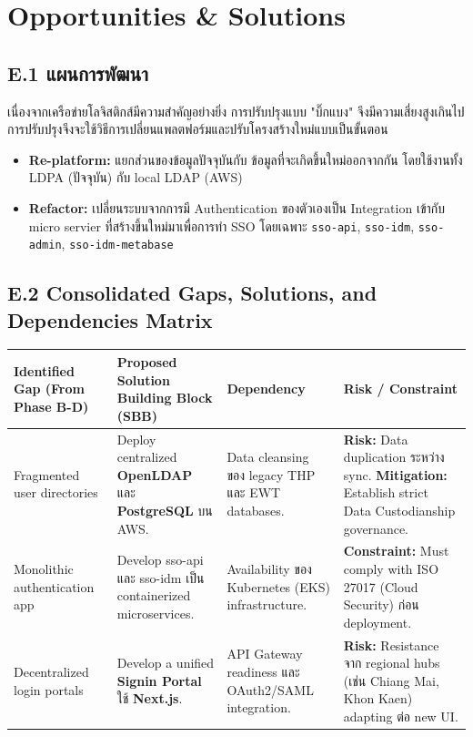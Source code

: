 \newpage\sloppy
\section{Opportunities \& Solutions}

\subsection{E.1 แผนการพัฒนา}
เนื่องจากเครือข่ายโลจิสติกส์มีความสำคัญอย่างยิ่ง การปรับปรุงแบบ "บิ๊กแบง" จึงมีความเสี่ยงสูงเกินไป การปรับปรุงจึงจะใช้วิธีการเปลี่ยนแพลตฟอร์มและปรับโครงสร้างใหม่แบบเป็นขั้นตอน\par

\begin{itemize}
    \item \textbf{Re-platform:} แยกส่วนของข้อมูลปัจจุบันกับ ข้อมูลที่จะเกิดขึ้นใหม่ออกจากกัน โดยใช้งานทั้ง LDPA (ปัจจุบัน) กับ local LDAP (AWS)
    \item \textbf{Refactor:} เปลี่ยนระบบจากการมี Authentication ของตัวเองเป็น Integration เข้ากับ micro servier ที่สร้างขึ้นใหม่มาเพื่อการทำ SSO โดยเฉพาะ \texttt{sso-api}, \texttt{sso-idm}, \texttt{sso-admin}, \texttt{sso-idm-metabase}
\end{itemize}

\subsection{E.2 Consolidated Gaps, Solutions, and Dependencies Matrix}
\begin{table}[h]
  \centering
  \begin{tabularx}{\textwidth}{|X|X|X|X|}
    \hline
    \textbf{Identified Gap (From Phase B-D)} & \textbf{Proposed Solution Building Block (SBB)} & \textbf{Dependency} & \textbf{Risk / Constraint} \\ \hline
    Fragmented user directories & Deploy centralized \textbf{OpenLDAP} และ \textbf{PostgreSQL} บน AWS. & Data cleansing ของ legacy THP และ EWT databases. & \textbf{Risk:} Data duplication ระหว่าง sync. \textbf{Mitigation:} Establish strict Data Custodianship governance. \\ \hline
    Monolithic authentication app & Develop sso-api และ sso-idm เป็น containerized microservices. & Availability ของ Kubernetes (EKS) infrastructure. & \textbf{Constraint:} Must comply with ISO 27017 (Cloud Security) ก่อน deployment. \\ \hline
    Decentralized login portals & Develop a unified \textbf{Signin Portal} ใช้ \textbf{Next.js}. & API Gateway readiness และ OAuth2/SAML integration. & \textbf{Risk:} Resistance จาก regional hubs (เช่น Chiang Mai, Khon Kaen) adapting ต่อ new UI. \\ \hline
  \end{tabularx}
\end{table}

